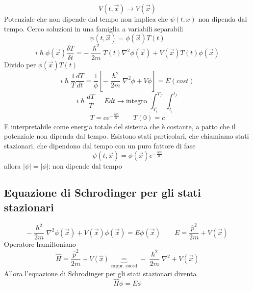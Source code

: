 \documentclass[a4paper,11pt]{report}
\theoremstyle{remark}
\theoremstyle{definition}
\begin{document}
\begin{equation*}
    V(t,\vec{x}) \rightarrow V(\vec{x})
\end{equation*}
Potenziale che non dipende dal tempo non implica che $\psi(t,x)$ non dipenda dal tempo. Cerco soluzioni in una famiglia a variabili separabili
\begin{equation*}
    \psi(t,\vec{x}) = \phi(\vec{x})T(t)
\end{equation*}
\begin{equation*}
    i\hslash \phi(\vec{x}) \frac{\delta T}{\delta t} = -\frac{\hslash^2}{2m} T(t) \nabla^2\phi(\vec{x}) + V(\vec{x})T(t)\phi(\vec{x})
\end{equation*}
Divido per $\phi(\vec{x})T(t)$
\begin{equation*}
    i\hslash \frac{1}{T} \frac{dT}{dt} = \frac{1}{\phi} \left[-\frac{\hslash^2}{2m}\nabla^2\phi + V\phi \right] = E(cost)
\end{equation*}
\begin{equation*}
    i\hslash \frac{dT}{T} = E dt \rightarrow \mbox{integro } \int_{T_i}^{T_f} \; \int_{t_i}^{t_f}
\end{equation*}
\begin{equation*}
    T = c e^{-\frac{iEt}{\hslash}} \qquad T(0) = c
\end{equation*}
E interpretabile come energia totale del sistema che è costante, a patto che il potenziale non dipenda dal tempo. Esistono stati particolari, che chiamiamo stati stazionari, che dipendono dal tempo con un puro fattore di fase
\begin{equation*}
    \psi(t,\vec{x}) = \phi(\vec{x}) e^{-\frac{iEt}{\hslash}}
\end{equation*}
allora $|\psi| = |\phi|$: non dipende dal tempo 

\subsection*{Equazione di Schrodinger per gli stati stazionari}

\begin{equation}
    -\frac{\hslash^2}{2m} \nabla^2\phi(\vec{x}) + V(\vec{x})\phi(\vec{x}) = E\phi(\vec{x}) \qquad E = \frac{\hat{p}^2}{2m} + V(\vec{x})
\end{equation}
Operatore hamiltoniano
\begin{equation*}
    \hat{H} = \frac{\hat{p}^2}{2m} + V(\hat{x}) \underbrace{=}_{\mbox{rappr. coord}} -\frac{\hslash^2}{2m}\nabla^2 + V(\vec{x})
\end{equation*}
Allora l'equazione di Schrodinger per gli stati stazionari diventa
\begin{equation*}
    \hat{H}\phi = E\phi 
\end{equation*}
\end{document}
